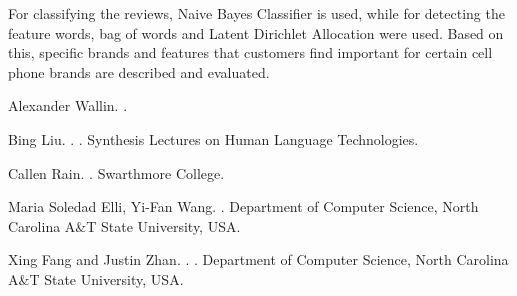 \documentclass[11pt]{article}
\begin{document}
  For classifying the reviews, Naive Bayes Classifier is used, while for detecting the feature words, bag of words and Latent Dirichlet Allocation were used. Based on this, specific brands and features that customers find important for certain cell phone brands are described and evaluated.  
  
 
  
  \begin{thebibliography}{}
  
  Alexander Wallin.
  .
  
  
  Bing Liu.
  .
  .
  \newblock Synthesis Lectures on Human Language Technologies.
  
  
  Callen Rain.
  .
  \newblock Swarthmore College.
  
  
  Maria Soledad Elli, Yi-Fan Wang.
  .
  \newblock Department of Computer Science, North Carolina A\&T State University, USA.
  
  Xing Fang and Justin Zhan.
  .
  .
  \newblock Department of Computer Science, North Carolina A\&T State University, USA.
  
  
  
  \end{thebibliography}


  
\end{document}
